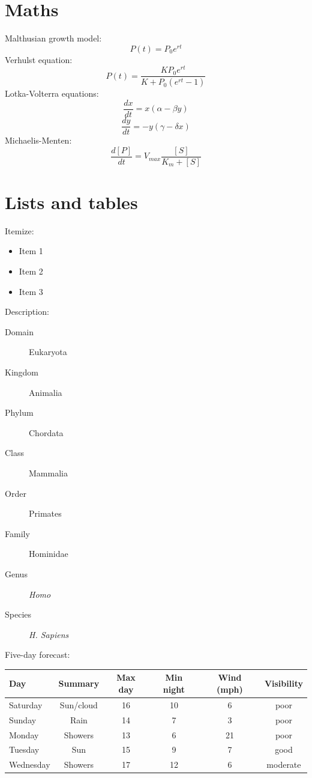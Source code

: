 \documentclass[a0,final]{a0poster}
\begin{document}
\begin{multicols}{3}
\section*{Maths}
Malthusian growth model:
$$P(t) = P_0 e^{rt}$$
Verhulst equation:
$$P(t) = \frac{K P_0 e^{rt}}{K + P_0 (e^{rt} - 1)}$$
Lotka-Volterra equations:
$$\frac{dx}{dt} = x(\alpha - \beta y)$$
$$\frac{dy}{dt} = - y(\gamma - \delta x)$$
Michaelis-Menten:
$$\frac{d[P]}{dt} = V_{max} \frac{[S]}{K_m + [S]}$$


\section*{Lists and tables}
Itemize:
\begin{itemize}
\item Item 1
\item Item 2
\item Item 3
\end{itemize}
\null
Description:
\begin{description}
\item[Domain] Eukaryota
\item[Kingdom] Animalia
\item[Phylum] Chordata
\item[Class] Mammalia
\item[Order] Primates
\item[Family] Hominidae
\item[Genus] \emph{Homo}
\item[Species] \emph{H. Sapiens}
\end{description}
\null
Five-day forecast:
\begin{center}
\begin{tabular}{lccccc}
Day & Summary & Max day & Min night & Wind (mph) & Visibility\\
\hline
Saturday & Sun/cloud & 16 & 10 & 6 & poor\\
Sunday & Rain & 14 & 7 & 3 & poor\\
Monday & Showers & 13 & 6 & 21 & poor\\
Tuesday & Sun & 15 & 9 & 7 & good\\
Wednesday & Showers & 17 & 12 & 6 &moderate
\end{tabular}
\end{center}

\end{multicols}
\end{document}
